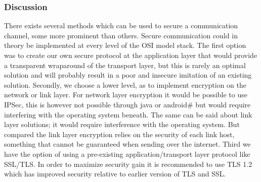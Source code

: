 \subsubsection{Discussion}
There exists several methods which can be used to secure a communication channel, some more prominent than others. Secure communication could in theory be implemented at every level of the OSI model stack. The first option was to create our own secure protocol at the application layer that would provide a transparent wraparound of the transport layer, but this is rarely an optimal solution and will probably result in a poor and insecure imitation of an existing solution.
\newline
\newline
Secondly, we choose a lower level, as to implement encryption on the network or link layer. For network layer encryption it would be possible to use IPSec, this is however not possible through java or android\# but would require interfering with the operating system beneath.  The same can be said about link layer solutions; it would require interference with the operating system. But compared the link layer encryption relies on the security of each link host, something that cannot be guaranteed when sending over the internet.
\newline
\newline
Third we have the option of using a pre-existing application/transport layer protocol like SSL/TLS. In order to maximize security gain it is recommended to use TLS 1.2  which has improved security relative to earlier version of TLS and SSL.